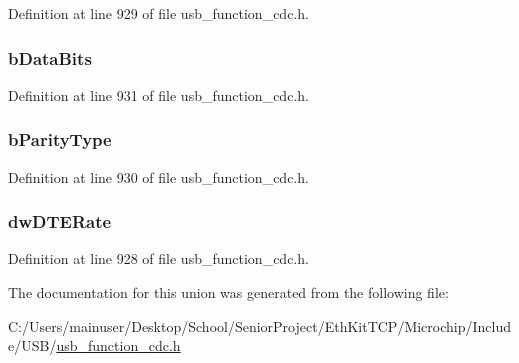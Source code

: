 Definition at line 929 of file usb\+\_\+function\+\_\+cdc.\+h.

\hypertarget{union___l_i_n_e___c_o_d_i_n_g_a302d162c7ae97d941879129a8be0ad95}{}
\subsubsection[{b\+Data\+Bits}]{ b\+Data\+Bits}\label{union___l_i_n_e___c_o_d_i_n_g_a302d162c7ae97d941879129a8be0ad95}


Definition at line 931 of file usb\+\_\+function\+\_\+cdc.\+h.

\hypertarget{union___l_i_n_e___c_o_d_i_n_g_a264c2ee2e2f600d79638ef4c50dd8954}{}
\subsubsection[{b\+Parity\+Type}]{ b\+Parity\+Type}\label{union___l_i_n_e___c_o_d_i_n_g_a264c2ee2e2f600d79638ef4c50dd8954}


Definition at line 930 of file usb\+\_\+function\+\_\+cdc.\+h.

\hypertarget{union___l_i_n_e___c_o_d_i_n_g_a3f19594f07e3ee40f13461244d422caa}{}
\subsubsection[{dw\+D\+T\+E\+Rate}]{ dw\+D\+T\+E\+Rate}\label{union___l_i_n_e___c_o_d_i_n_g_a3f19594f07e3ee40f13461244d422caa}


Definition at line 928 of file usb\+\_\+function\+\_\+cdc.\+h.



The documentation for this union was generated from the following file\+:\begin{DoxyCompactItemize}
\item 
C\+:/\+Users/mainuser/\+Desktop/\+School/\+Senior\+Project/\+Eth\+Kit\+T\+C\+P/\+Microchip/\+Include/\+U\+S\+B/\hyperlink{usb__function__cdc_8h}{usb\+\_\+function\+\_\+cdc.\+h}\end{DoxyCompactItemize}
